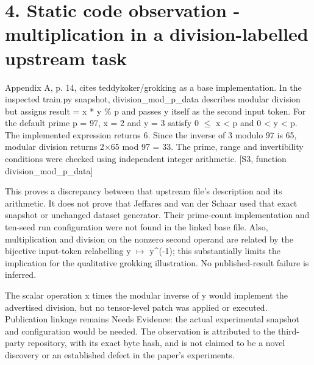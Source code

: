 \documentclass[10pt]{article}
\begin{document}
\section*{4. Static code observation - multiplication in a division-labelled upstream task}
Appendix A, p. 14, cites teddykoker/grokking as a base implementation. In the inspected train.py snapshot, division\_mod\_p\_data describes modular division but assigns result = x * y \% p and passes y itself as the second input token. For the default prime p = 97, x = 2 and y = 3 satisfy 0 \(\leq\) x < p and 0 < y < p. The implemented expression returns 6. Since the inverse of 3 modulo 97 is 65, modular division returns 2\(\times\)65 mod 97 = 33. The prime, range and invertibility conditions were checked using independent integer arithmetic. [S3, function division\_mod\_p\_data]\par
This proves a discrepancy between that upstream file’s description and its arithmetic. It does not prove that Jeffares and van der Schaar used that exact snapshot or unchanged dataset generator. Their prime-count implementation and ten-seed run configuration were not found in the linked base file. Also, multiplication and division on the nonzero second operand are related by the bijective input-token relabelling y \(\mapsto\) y\textasciicircum{}(-1); this substantially limits the implication for the qualitative grokking illustration. No published-result failure is inferred.\par
The scalar operation x times the modular inverse of y would implement the advertised division, but no tensor-level patch was applied or executed. Publication linkage remains Needs Evidence: the actual experimental snapshot and configuration would be needed. The observation is attributed to the third-party repository, with its exact byte hash, and is not claimed to be a novel discovery or an established defect in the paper’s experiments.\par
\end{document}
